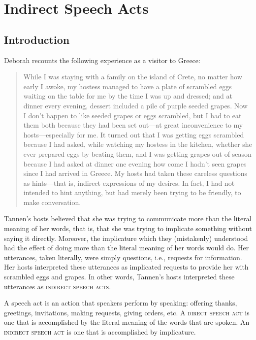 \chapter{Indirect Speech Acts}\label{sec:10}

\section{Introduction}\label{sec:10.1}

Deborah \citet{Tannen1981} recounts the following experience as a visitor to Greece:


\begin{quote}
While I was staying with a family on the island of Crete, no matter how early I awoke, my hostess managed to have a plate of scrambled eggs waiting on the table for me by the time I was up and dressed; and at dinner every evening, dessert included a pile of purple seeded grapes. Now I don’t happen to like seeded grapes or eggs scrambled, but I had to eat them both because they had been set out—at great inconvenience to my hosts—especially for me. It turned out that I was getting eggs scrambled because I had asked, while watching my hostess in the kitchen, whether she ever prepared eggs by beating them, and I was getting grapes out of season because I had asked at dinner one evening how come I hadn’t seen grapes since I had arrived in Greece. My hosts had taken these careless questions as hints—that is, indirect expressions of my desires. In fact, I had not intended to hint anything, but had merely been trying to be friendly, to make conversation.
\end{quote}


Tannen’s hosts believed that she was trying to communicate more than the literal meaning of her words, that is, that she was trying to implicate something without saying it directly. Moreover, the implicature which they (mistakenly) understood had the effect of doing more than the literal meaning of her words would do. Her utterances, taken literally, were simply questions, i.e., requests for information. Her hosts interpreted these utterances as implicated requests to provide her with scrambled eggs and grapes. In other words, Tannen’s hosts interpreted these utterances as \textsc{indirect speech acts}.



A speech act is an action that speakers perform by speaking: offering thanks, greetings, invitations, making requests, giving orders, etc. A \textsc{direct speech act} is one that is accomplished by the literal meaning of the words that are spoken. An \textsc{indirect speech act} is one that is accomplished by implicature.



